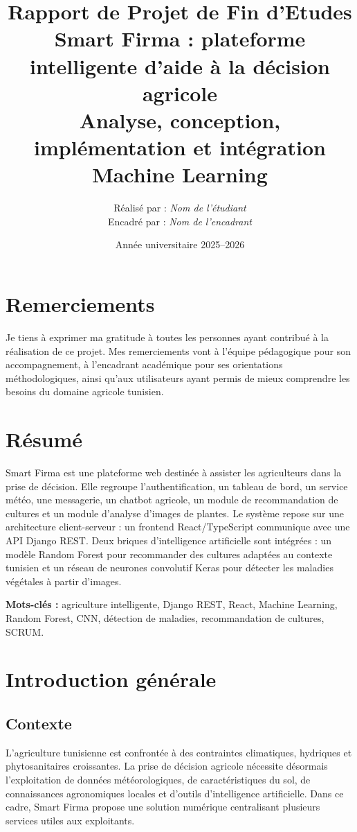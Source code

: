 \documentclass[12pt,a4paper]{report}
\title{
  \vspace{2cm}
  \textbf{\Huge Rapport de Projet de Fin d'Etudes}\\[0.5cm]
  \textbf{\Large Smart Firma : plateforme intelligente d'aide à la décision agricole}\\[1cm]
  \large Analyse, conception, implémentation et intégration Machine Learning
}
\author{
  Réalisé par : \textit{Nom de l'étudiant}\\
  Encadré par : \textit{Nom de l'encadrant}
}
\date{Année universitaire 2025--2026}
\begin{document}
\maketitle
{}

\chapter*{Remerciements}
Je tiens à exprimer ma gratitude à toutes les personnes ayant contribué à la réalisation de ce projet. Mes remerciements vont à l'équipe pédagogique pour son accompagnement, à l'encadrant académique pour ses orientations méthodologiques, ainsi qu'aux utilisateurs ayant permis de mieux comprendre les besoins du domaine agricole tunisien.

\chapter*{Résumé}
Smart Firma est une plateforme web destinée à assister les agriculteurs dans la prise de décision. Elle regroupe l'authentification, un tableau de bord, un service météo, une messagerie, un chatbot agricole, un module de recommandation de cultures et un module d'analyse d'images de plantes. Le système repose sur une architecture client-serveur : un frontend React/TypeScript communique avec une API Django REST. Deux briques d'intelligence artificielle sont intégrées : un modèle Random Forest pour recommander des cultures adaptées au contexte tunisien et un réseau de neurones convolutif Keras pour détecter les maladies végétales à partir d'images.

\textbf{Mots-clés :} agriculture intelligente, Django REST, React, Machine Learning, Random Forest, CNN, détection de maladies, recommandation de cultures, SCRUM.

\tableofcontents
\listoffigures
\listoftables
\clearpage
{}

\chapter{Introduction générale}

\section{Contexte}
L'agriculture tunisienne est confrontée à des contraintes climatiques, hydriques et phytosanitaires croissantes. La prise de décision agricole nécessite désormais l'exploitation de données météorologiques, de caractéristiques du sol, de connaissances agronomiques locales et d'outils d'intelligence artificielle. Dans ce cadre, Smart Firma propose une solution numérique centralisant plusieurs services utiles aux exploitants.
\end{document}
